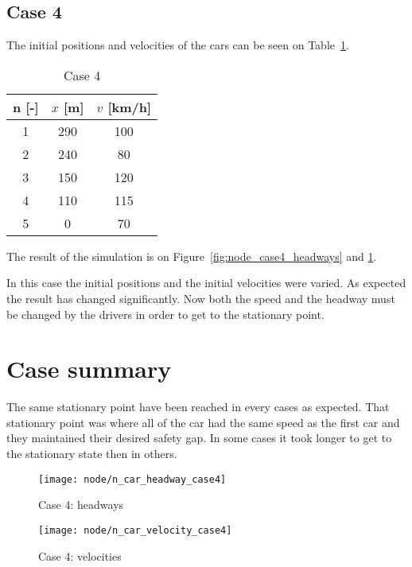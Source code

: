 		\subsection*{Case 4}
		The initial positions and velocities of the cars can be seen on Table~\ref{tab:node_case4}.
		\begin{table}
			\centering
			\begin{tabular}{ |c|c|c| }
				\hline
				n [-] & $x$ [m] & $v$ [km/h]\\
				\hline
				1 & 290 & 100 \\
				2 & 240 & 80 \\
				3 & 150 & 120 \\
				4 & 110& 115 \\
				5 & 0 & 70 \\
				\hline
			\end{tabular}
			\caption{Case 4}
			\label{tab:node_case4}
		\end{table}
		The result of the simulation is on Figure~\ref{fig:node_case4_headways} and \ref{fig:node_case4_velocities}. 

		In this case the initial positions and the initial velocities were varied. As expected the result has changed significantly. Now both the speed and the headway must be changed by the drivers in order to get to the stationary point.
		\section*{Case summary}
		The same stationary point have been reached in every cases as expected. That stationary point was where all of the car had the same speed as the first car and they maintained their desired safety gap. In some cases it took longer to get to the stationary state then in others.
		\begin{figure}
			\centering
			\begin{minipage}{.5\textwidth}
				\centering
				\texttt{[image: node/n\_car\_headway\_case4]}
				\caption{Case 4: headways}
				\label{fig:node_case4_headways}
			\end{minipage}\hfill
			\begin{minipage}{.5\textwidth}
				\centering
				\texttt{[image: node/n\_car\_velocity\_case4]}
				\caption{Case 4: velocities}
				\label{fig:node_case4_velocities}
			\end{minipage}
		\end{figure}
